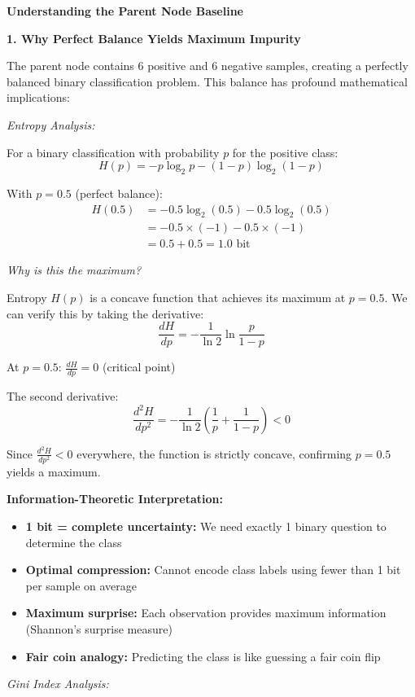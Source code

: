 \documentclass[12pt]{article}
\begin{document}
\begin{explanation}
\textbf{Understanding the Parent Node Baseline}

\textbf{1. Why Perfect Balance Yields Maximum Impurity}

The parent node contains 6 positive and 6 negative samples, creating a perfectly balanced binary classification problem. This balance has profound mathematical implications:

\textit{Entropy Analysis:}

For a binary classification with probability $p$ for the positive class:
\[
H(p) = -p\log_2 p - (1-p)\log_2(1-p)
\]

With $p = 0.5$ (perfect balance):
\begin{align*}
H(0.5) &= -0.5\log_2(0.5) - 0.5\log_2(0.5) \\
&= -0.5 \times (-1) - 0.5 \times (-1) \\
&= 0.5 + 0.5 = 1.0 \text{ bit}
\end{align*}

\textit{Why is this the maximum?}

Entropy $H(p)$ is a concave function that achieves its maximum at $p = 0.5$. We can verify this by taking the derivative:
\[
\frac{dH}{dp} = -\frac{1}{\ln 2}\ln\frac{p}{1-p}
\]

At $p = 0.5$: $\frac{dH}{dp} = 0$ (critical point)

The second derivative:
\[
\frac{d^2H}{dp^2} = -\frac{1}{\ln 2}\left(\frac{1}{p} + \frac{1}{1-p}\right) < 0
\]

Since $\frac{d^2H}{dp^2} < 0$ everywhere, the function is strictly concave, confirming $p = 0.5$ yields a maximum.

\textbf{Information-Theoretic Interpretation:}
\begin{itemize}
    \item \textbf{1 bit = complete uncertainty:} We need exactly 1 binary question to determine the class
    \item \textbf{Optimal compression:} Cannot encode class labels using fewer than 1 bit per sample on average
    \item \textbf{Maximum surprise:} Each observation provides maximum information (Shannon's surprise measure)
    \item \textbf{Fair coin analogy:} Predicting the class is like guessing a fair coin flip
\end{itemize}

\textit{Gini Index Analysis:}


\end{explanation}
\end{document}
